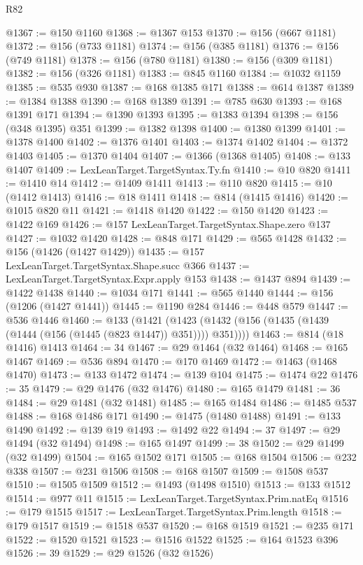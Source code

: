 \begin{lexlean}{R82}
\begin{coremodule}
@1367 := @150 @1160
@1368 := @1367 @153
@1370 := @156 (@667 @1181)
@1372 := @156 (@733 @1181)
@1374 := @156 (@385 @1181)
@1376 := @156 (@749 @1181)
@1378 := @156 (@780 @1181)
@1380 := @156 (@309 @1181)
@1382 := @156 (@326 @1181)
@1383 := @845 @1160
@1384 := @1032 @1159
@1385 := @535 @930
@1387 := @168 @1385 @171
@1388 := @614 @1387
@1389 := @1384 @1388
@1390 := @168 @1389
@1391 := @785 @630
@1393 := @168 @1391 @171
@1394 := @1390 @1393
@1395 := @1383 @1394
@1398 := @156 (@348 @1395) @351
@1399 := @1382 @1398
@1400 := @1380 @1399
@1401 := @1378 @1400
@1402 := @1376 @1401
@1403 := @1374 @1402
@1404 := @1372 @1403
@1405 := @1370 @1404
@1407 := @1366 (@1368 @1405)
@1408 := @133 @1407
@1409 := LexLeanTarget.TargetSyntax.Ty.fn
@1410 := @10 @820
@1411 := @1410 @14
@1412 := @1409 @1411
@1413 := @110 @820
@1415 := @10 (@1412 @1413)
@1416 := @18 @1411
@1418 := @814 (@1415 @1416)
@1420 := @1015 @820 @11
@1421 := @1418 @1420
@1422 := @150 @1420
@1423 := @1422 @169
@1426 := @157 LexLeanTarget.TargetSyntax.Shape.zero @137
@1427 := @1032 @1420
@1428 := @848 @171
@1429 := @565 @1428
@1432 := @156 (@1426 (@1427 @1429))
@1435 := @157 LexLeanTarget.TargetSyntax.Shape.succ @366
@1437 := LexLeanTarget.TargetSyntax.Expr.apply @153
@1438 := @1437 @894
@1439 := @1422 @1438
@1440 := @1034 @171
@1441 := @565 @1440
@1444 := @156 (@1206 (@1427 @1441))
@1445 := @1190 @284
@1446 := @448 @579
@1447 := @536 @1446
@1460 := @133
    (@1421 (@1423 (@1432 (@156 (@1435 (@1439 (@1444 (@156 (@1445 (@823 @1447)) @351)))) @351))))
@1463 := @814 (@18 @1416) @1413
@1464 := 34
@1467 := @29 @1464 (@32 @1464)
@1468 := @165 @1467
@1469 := @536 @894
@1470 := @170 @1469
@1472 := @1463 (@1468 @1470)
@1473 := @133 @1472
@1474 := @139 @104
@1475 := @1474 @22
@1476 := 35
@1479 := @29 @1476 (@32 @1476)
@1480 := @165 @1479
@1481 := 36
@1484 := @29 @1481 (@32 @1481)
@1485 := @165 @1484
@1486 := @1485 @537
@1488 := @168 @1486 @171
@1490 := @1475 (@1480 @1488)
@1491 := @133 @1490
@1492 := @139 @19
@1493 := @1492 @22
@1494 := 37
@1497 := @29 @1494 (@32 @1494)
@1498 := @165 @1497
@1499 := 38
@1502 := @29 @1499 (@32 @1499)
@1504 := @165 @1502 @171
@1505 := @168 @1504
@1506 := @232 @338
@1507 := @231 @1506
@1508 := @168 @1507
@1509 := @1508 @537
@1510 := @1505 @1509
@1512 := @1493 (@1498 @1510)
@1513 := @133 @1512
@1514 := @977 @11
@1515 := LexLeanTarget.TargetSyntax.Prim.natEq
@1516 := @179 @1515
@1517 := LexLeanTarget.TargetSyntax.Prim.length
@1518 := @179 @1517
@1519 := @1518 @537
@1520 := @168 @1519
@1521 := @235 @171
@1522 := @1520 @1521
@1523 := @1516 @1522
@1525 := @164 @1523 @396
@1526 := 39
@1529 := @29 @1526 (@32 @1526)

\end{coremodule}
\end{lexlean}
